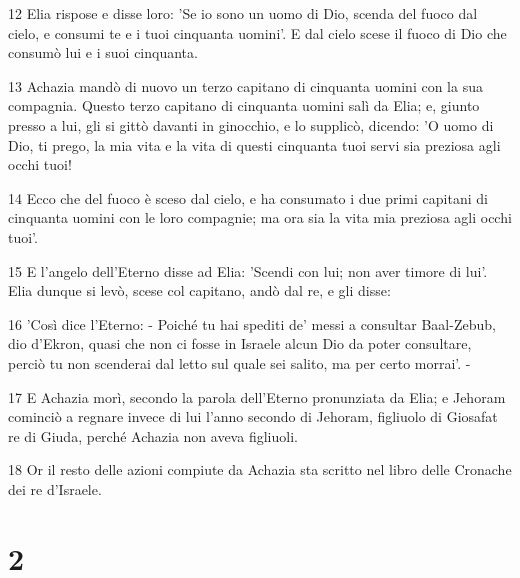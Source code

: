 \par 12 Elia rispose e disse loro: 'Se io sono un uomo di Dio, scenda del fuoco dal cielo, e consumi te e i tuoi cinquanta uomini'. E dal cielo scese il fuoco di Dio che consumò lui e i suoi cinquanta.
\par 13 Achazia mandò di nuovo un terzo capitano di cinquanta uomini con la sua compagnia. Questo terzo capitano di cinquanta uomini salì da Elia; e, giunto presso a lui, gli si gittò davanti in ginocchio, e lo supplicò, dicendo: 'O uomo di Dio, ti prego, la mia vita e la vita di questi cinquanta tuoi servi sia preziosa agli occhi tuoi!
\par 14 Ecco che del fuoco è sceso dal cielo, e ha consumato i due primi capitani di cinquanta uomini con le loro compagnie; ma ora sia la vita mia preziosa agli occhi tuoi'.
\par 15 E l'angelo dell'Eterno disse ad Elia: 'Scendi con lui; non aver timore di lui'. Elia dunque si levò, scese col capitano, andò dal re, e gli disse:
\par 16 'Così dice l'Eterno: - Poiché tu hai spediti de' messi a consultar Baal-Zebub, dio d'Ekron, quasi che non ci fosse in Israele alcun Dio da poter consultare, perciò tu non scenderai dal letto sul quale sei salito, ma per certo morrai'. -
\par 17 E Achazia morì, secondo la parola dell'Eterno pronunziata da Elia; e Jehoram cominciò a regnare invece di lui l'anno secondo di Jehoram, figliuolo di Giosafat re di Giuda, perché Achazia non aveva figliuoli.
\par 18 Or il resto delle azioni compiute da Achazia sta scritto nel libro delle Cronache dei re d'Israele.

\chapter{2}


